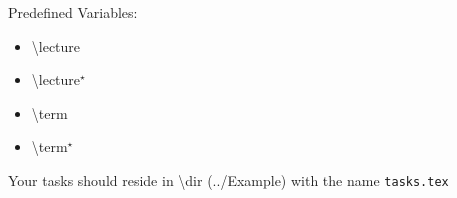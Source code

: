 \documentclass[a4paper,12pt]{article}
\makeatletter
\newcommand{\dir}{../Example\no}
\def\maketitle{%
\par\textbf{\@title}%
\par{\@author}%
\par{\@@lecture}%
\par{\@@term}%
\par}
\makeatother
\begin{document}
\maketitle
\thispagestyle{empty}
\clearpage


Predefined Variables:
\begin{itemize}
  \item \textbackslash lecture \lecture
  \item \textbackslash lecture$^\star$ \lecture*
  \item \textbackslash term \term
  \item \textbackslash term$^\star$ \term*
\end{itemize}

\newpage
Your tasks should reside in \textbackslash dir (\dir) with the name \texttt{tasks.tex}

\end{document}
